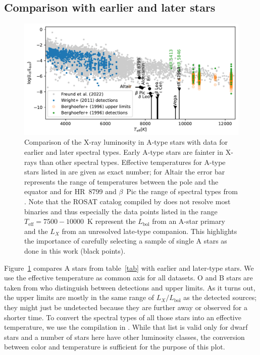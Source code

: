 \documentclass[linenumbers]{aastex631}
\begin{document}
\subsection{Comparison with earlier and later stars}
\begin{figure}
    \centering
    \includegraphics[width=\textwidth]{lxlbol.pdf}
    \caption{Comparison of the X-ray luminosity in A-type stars with data for earlier and later spectral types. Early A-type stars are fainter in X-rays than other spectral types. Effective temperatures for A-type stars listed in \citet{2002ApJ...579..800S} are given as exact number; for Altair the error bar represents the range of temperatures between the pole and the equator \citep{2007Sci...317..342M} and for HR~8799 and $\beta$~Pic the range of spectral types from \citet{2014yCat....1.2023S}.
     Note that the ROSAT catalog compiled by \citet{Freund} does not resolve most binaries and thus especially the data points listed in the range $T_\mathrm{eff}=7500-10000$~K represent the $L_\mathrm{bol}$ from an A-star primary and the $L_X$ from an unresolved late-type companion. This highlights the importance of carefully selecting a sample of single A stars as done in this work (black points).} \label{fig:lxlbol}
\end{figure}

Figure~\ref{fig:lxlbol} compares A stars from table~\ref{tab} with earlier and later-type stars. We use the effective temperature as common axis for all datasets. 
O and B stars are taken from \citet{1996A&AS..118..481B} who distinguish between detections and upper limits. As it turns out, the upper limits are mostly in the same range of $L_X/L_\mathrm{bol}$ as the detected sources; they might just be undetected because they are further away or observed for a shorter time. To convert the spectral types of all those stars into an effective temperature, we use the compilation in \citet{2013ApJS..208....9P}. While that list is valid only for dwarf stars and a number of stars here have other luminosity classes, the conversion between color and temperature is sufficient for the purpose of this plot.
\end{document}
